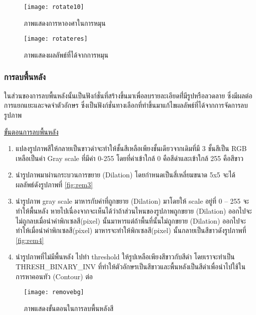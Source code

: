 \begin{enumerate}
\begin{figure}[H]
    \centering
    \texttt{[image: rotate10]}
    \caption{ภาพแสดงการหาองศาในการหมุน}\label{fig:rotate10}
\end{figure}

\begin{figure}[H]
    \centering
    \texttt{[image: rotateres]}
    \caption{ภาพแสดงผลลัพธ์ที่ได้จากการหมุน}\label{fig:rotateres}
\end{figure}
    
\end{enumerate}

\subsubsection{การลบพื้นหลัง}
ในส่วนของการลบพื้นหลังนั้นเป็นฟังก์ชั่นที่สร้างขึ้นมาเพื่อลบรายละเอียดที่่มีรูปหรือลวดลาย ซึ่งมีผลต่อการแยกแยะและจดจำตัวอักษร 
ซึ่งเป็นฟังก์ชั่นทางเลือกที่ทำขึ้นมาแก้ไขผลลัพธ์ที่ได้จากการจัดการลบรูปภาพ

\underline{ขั้นตอนการลบพื้นหลัง}

\begin{enumerate}
    \item แปลงรูปภาพสีให้กลายเป็นขาวดำจะทำให้ชั้นสีเหลือเพียงชั้นเดียวจากเดิมที่มี 3 ชั้นสีเป็น RGB เหลือเป็นค่า Gray scale ที่มีค่า 0-255 โดยที่ค่าเข้าใกล้ 0 คือสีดำและเข้าใกล้ 255 คือสีขาว
    \item นำรูปภาพมาผ่านกระบวนการขยาย (Dilation) โดยกำหนดเป็นสี่เหลี่ยมขนาด 5x5 จะได้ผลลัพธ์ดังรูปภาพที่ \ref{fig:rem3}
    \item นำรูปภาพ gray scale มาหารกับค่าที่ถูกขยาย (Dilation) มาโดยให้ scale อยู่ที่ 0 – 255 จะทำให้พื้นหลัง หายไปเนื่องจากจะเห็นได้ว่าถ้าส่วนไหนของรูปภาพถูกขยาย (Dilation) ออกไปจะไม่ถูกลบเมื่อนำค่าพิกเซลสี(pixel) นั้นมาหารแต่ถ้าพื้นที่นั้นไม่ถูกขยาย (Dilation) ออกไปจะทำให้เมื่อนำค่าพิกเซลสี(pixel) มาหารจะทำให้พิกเซลสี(pixel) นั้นกลายเป็นสีขาวดังรูปภาพที่ \ref{fig:rem4}
    \item นำรูปภาพที่ไม่มีพื้นหลัง ไปทำ threshold ให้รูปเหลือเพียงสีขาวกับสีดำ โดยเราจะทำเป็น THRESH\_BINARY\_INV ที่ทำให้ตัวอักษรเป็นสีขาวและพื้นหลังเป็นสีดำเพื่อนำไปใช้ในการหาคอนทัว (Contour) ต่อ
    \end{enumerate}

\begin{figure}[H]
    \centering
    \texttt{[image: removebg]}
    \caption{ภาพแสดงขั้นตอนในการลบพื้นหลังสี}\label{fig:removebg}
\end{figure}


